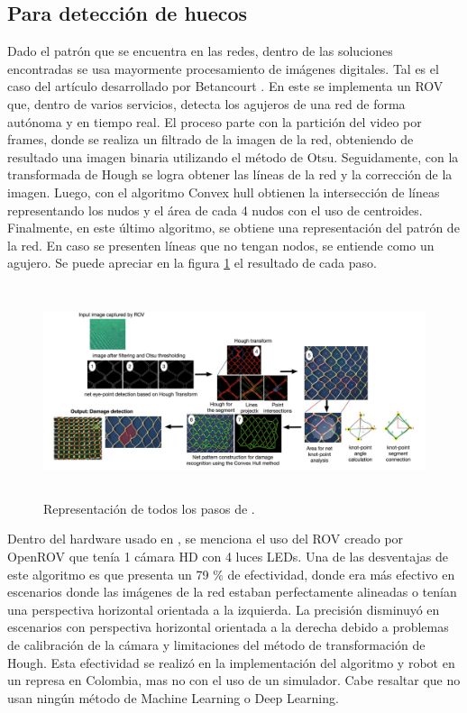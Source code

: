 \subsection{Para detección de huecos}
Dado el patrón que se encuentra en las redes, dentro de las soluciones encontradas se usa mayormente procesamiento de imágenes digitales. Tal es el caso del artículo desarrollado por Betancourt \cite{cite:Betancourt}. En este se implementa un ROV que, dentro de varios servicios, detecta los agujeros de una red de forma autónoma y en tiempo real. El proceso parte con la partición del video por frames, donde se realiza un filtrado de la imagen de la red, obteniendo de resultado una imagen binaria utilizando el método de Otsu. Seguidamente, con la transformada de Hough se logra obtener las líneas de la red y la corrección de la imagen. Luego, con el algoritmo Convex hull obtienen la intersección de líneas representando los nudos y el área de cada 4 nudos con el uso de centroides. Finalmente, en este último algoritmo, se obtiene una representación del patrón de la red. En caso se presenten líneas que no tengan nodos, se entiende como un agujero. Se puede apreciar en la figura \ref{fig:Betancourt_1} el resultado de cada paso. 

\begin{figure}[!h]
    \begin{center}
    \includegraphics[height=6.2cm]{images/Betancourt_1} 
    \caption{\label{fig:Betancourt_1}Representación de todos los pasos de \cite{cite:Betancourt}.}
    \end{center}
\end{figure}

Dentro del hardware usado en \cite{cite:Betancourt}, se menciona el uso del ROV creado por OpenROV que tenía 1 cámara HD con 4 luces LEDs. Una de las desventajas de este algoritmo es que presenta un 79 \% de efectividad, donde era más efectivo en escenarios donde las imágenes de la red estaban perfectamente alineadas o tenían una perspectiva horizontal orientada a la izquierda. La precisión disminuyó en escenarios con perspectiva horizontal orientada a la derecha debido a problemas de calibración de la cámara y limitaciones del método de transformación de Hough. Esta efectividad se realizó en la implementación del algoritmo y robot en un represa en Colombia, mas no con el uso de un simulador. Cabe resaltar que no usan ningún método de Machine Learning o Deep Learning.


